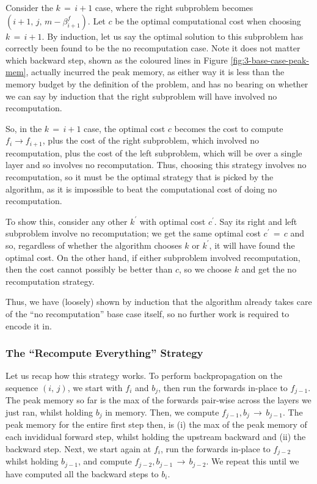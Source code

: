 Consider the \(k\,=\,i+1\) case, where the right subproblem becomes \((i+1,\,j,\,m-\beta^f_{i+1})\).
Let \(c\) be the optimal computational cost when choosing \(k\,=\,i+1\).
By induction, let us say the optimal solution to this subproblem has correctly been found to be the no recomputation case.
Note it does not matter which backward step, shown as the coloured lines in Figure \ref{fig:3-base-case-peak-mem}, actually incurred the peak memory,
as either way it is less than the memory budget by the definition of the problem, and has no bearing on whether we can say by induction that the right subproblem will have involved no recomputation.

So, in the \(k\,=\,i+1\) case, the optimal cost \(c\) becomes the cost to compute \(f_i\rightarrow f_{i+1}\), plus the cost of the right subproblem, which involved no recomputation, plus the cost of the left subproblem, which will be over a single layer and so involves no recomputation.
Thus, choosing this strategy involves no recomputation, so it must be the optimal strategy that is picked by the algorithm, as it is impossible to beat the computational cost of doing no recomputation.

To show this, consider any other \(k^\prime\) with optimal cost \(c^\prime\).
Say its right and left subproblem involve no recomputation;
we get the same optimal cost \(c^\prime\,=\,c\) and so, regardless of whether the algorithm chooses \(k\) or \(k^\prime\), it will have found the optimal cost.
On the other hand, if either subproblem involved recomputation, then the cost cannot possibly be better than \(c\), so we choose \(k\) and get the no recomputation strategy.

Thus, we have (loosely) shown by induction that the algorithm already takes care of the ``no recomputation'' base case itself, so no further work is required to encode it in.

\subsubsection{The ``Recompute Everything'' Strategy}
Let us recap how this strategy works.
To perform backpropagation on the sequence \((i,\,j)\), we start with \(f_i\) and \(b_j\), then run the forwards in-place to \(f_{j-1}\).
The peak memory so far is the max of the forwards pair-wise across the layers we just ran, whilst holding \(b_j\) in memory.
Then, we compute \(f_{j-1}, b_j \,\rightarrow\, b_{j-1}\).
The peak memory for the entire first step then, is (i) the max of the peak memory of each invididual forward step, whilst holding the upstream backward and (ii) the backward step.
Next, we start again at \(f_i\), run the forwards in-place to \(f_{j-2}\) whilst holding \(b_{j-1}\), and compute \(f_{j-2}, b_{j-1} \,\rightarrow\, b_{j-2}\).
We repeat this until we have computed all the backward steps to \(b_i\).

